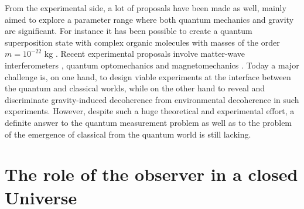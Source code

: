 \documentclass{ws-procs961x669}            %
\begin{document}
From the experimental side, a lot of proposals have been made as
well, mainly aimed to explore a parameter range where both quantum
mechanics and gravity are significant. For instance it has been
possible to create a quantum superposition state with complex
organic molecules with masses of the order $m=10^{-22}$ kg
\cite{arndt1,arndt2}. Recent experimental proposals involve
matter-wave interferometers \cite{matterW1,matterW2,matterW3},
quantum optomechanics \cite{bose,marshall,mio,oriol} and
magnetomechanics \cite{mag1}. Today a major challenge is, on one
hand, to design viable experiments at the interface between the
quantum and classical worlds, while on the other hand to reveal
and discriminate gravity-induced decoherence from environmental
decoherence in such experiments. However, despite such a huge
theoretical and experimental effort, a definite answer to the
quantum measurement problem as well as to the problem of the
emergence of classical from the quantum world is still lacking.



\section{The role of the observer in a closed Universe}
\end{document}
